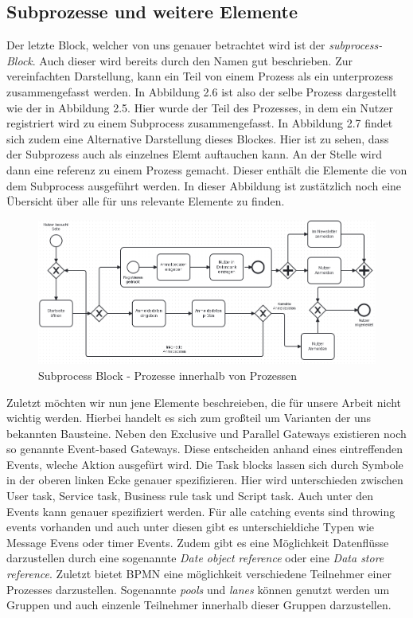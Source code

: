 \subsection{Subprozesse und weitere Elemente}
Der letzte Block, welcher von uns genauer betrachtet wird ist der \textit{subprocess-Block}. Auch dieser wird bereits durch den Namen gut beschrieben. Zur vereinfachten Darstellung, kann ein Teil von einem Prozess als ein unterprozess zusammengefasst werden. In Abbildung 2.6 ist also der selbe Prozess dargestellt wie der in Abbildung 2.5. Hier wurde der Teil des Prozesses, in dem ein Nutzer registriert wird zu einem Subprocess zusammengefasst. In Abbildung 2.7 findet sich zudem eine Alternative Darstellung dieses Blockes. Hier ist zu sehen, dass der Subprozess auch als einzelnes Elemt auftauchen kann. An der Stelle wird dann eine referenz zu einem Prozess gemacht. Dieser enthält die Elemente die von dem Subprocess ausgeführt werden. In dieser Abbildung ist zustätzlich noch eine Übersicht über alle für uns relevante Elemente zu finden.\\
\begin{figure}
\centering
\includegraphics[scale=0.5]{Figures/Beispiel7}
\decoRule
\caption[Subprocess Block]{Subprocess Block - Prozesse innerhalb von Prozessen}
\label{fig:Task}
\end{figure}Zuletzt möchten wir nun jene Elemente beschreieben, die für unsere Arbeit nicht wichtig werden. Hierbei handelt es sich zum großteil um Varianten der uns bekannten Bausteine. Neben den Exclusive und Parallel Gateways existieren noch so genannte Event-based Gateways. Diese entscheiden anhand eines eintreffenden Events, wleche Aktion ausgefürt wird. 
Die Task blocks lassen sich durch Symbole in der oberen linken Ecke genauer spezifizieren. Hier wird unterschieden zwischen User task, Service task, Business rule task und Script task. Auch unter den Events kann genauer spezifiziert werden. Für alle catching events sind throwing events vorhanden und auch unter diesen gibt es unterschieldiche Typen wie Message Evens oder timer Events. Zudem gibt es eine Möglichkeit Datenflüsse darzustellen durch eine sogenannte \textit{Date object reference} oder eine \textit{Data store reference}. Zuletzt bietet BPMN eine möglichkeit verschiedene Teilnehmer einer Prozesses darzustellen. Sogenannte \textit{pools} und \textit{lanes} können genutzt werden um Gruppen und auch einzenle Teilnehmer innerhalb dieser Gruppen darzustellen.\\
